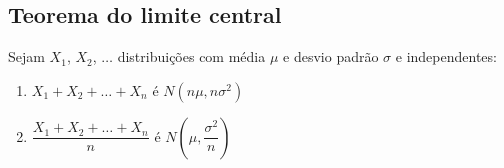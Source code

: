 \documentclass[a4paper]{article}
\begin{document}
	\subsection{Teorema do limite central}
	
	Sejam $X_1$, $X_2$, $\dots$ distribuições com média $\mu$ e desvio padrão $\sigma$ e independentes:
	
	\begin{enumerate}
		\item $X_1 + X_2 + \dots +X_n$ é $N(n\mu, n\sigma^2)$
		\item $\dfrac{X_1 + X_2 + \dots + X_n}{n}$ é $N\left( \mu,\dfrac{\sigma^2}{n} \right)$
	\end{enumerate}
	
	
	
	
		
	
\end{document}
